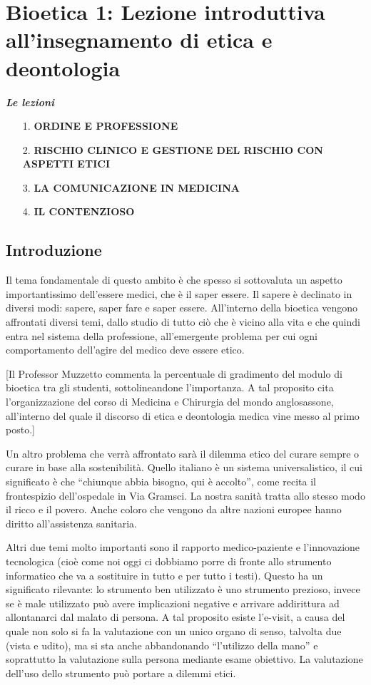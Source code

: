 \section{Bioetica 1: Lezione introduttiva all'insegnamento di etica e deontologia}

\textbf{\emph{Le lezioni}}
\begin{itemize}
\item[1.] \textbf{ORDINE E PROFESSIONE}
\item[2.] \textbf{RISCHIO CLINICO E GESTIONE DEL RISCHIO CON ASPETTI ETICI}
\item[3.] \textbf{LA COMUNICAZIONE IN MEDICINA }
\item[4.] \textbf{IL CONTENZIOSO}
\end{itemize}

\subsection{Introduzione}

Il tema fondamentale di questo ambito è che spesso si sottovaluta un
aspetto importantissimo dell'essere medici, che è il saper essere. Il
sapere è declinato in diversi modi: sapere, saper fare e saper essere.
All'interno della bioetica vengono affrontati diversi temi, dallo studio
di tutto ciò che è vicino alla vita e che quindi entra nel sistema della
professione, all'emergente problema per cui ogni comportamento
dell'agire del medico deve essere etico.

{[}Il Professor Muzzetto commenta la percentuale di gradimento del
modulo di bioetica tra gli studenti, sottolineandone l'importanza. A tal
proposito cita l'organizzazione del corso di Medicina e Chirurgia del
mondo anglosassone, all'interno del quale il discorso di etica e
deontologia medica vine messo al primo posto.{]}

Un altro problema che verrà affrontato sarà il dilemma etico del curare
sempre o curare in base alla sostenibilità. Quello italiano è un sistema
universalistico, il cui significato è che ``chiunque abbia bisogno, qui
è accolto'', come recita il frontespizio dell'ospedale in Via Gramsci.
La nostra sanità tratta allo stesso modo il ricco e il povero. Anche
coloro che vengono da altre nazioni europee hanno diritto all'assistenza
sanitaria.

Altri due temi molto importanti sono il rapporto medico-paziente e
l'innovazione tecnologica (cioè come noi oggi ci dobbiamo porre di
fronte allo strumento informatico che va a sostituire in tutto e per
tutto i testi). Questo ha un significato rilevante: lo strumento ben
utilizzato è uno strumento prezioso, invece se è male utilizzato può
avere implicazioni negative e arrivare addirittura ad allontanarci dal
malato di persona. A tal proposito esiste l'e-visit, a causa del quale
non solo si fa la valutazione con un unico organo di senso, talvolta due
(vista e udito), ma si sta anche abbandonando ``l'utilizzo della mano''
e soprattutto la valutazione sulla persona mediante esame obiettivo. La
valutazione dell'uso dello strumento può portare a dilemmi etici.

